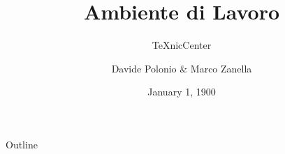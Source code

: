 \documentclass{beamer}
\title{Ambiente di Lavoro}
\subtitle{TeXnicCenter}
\author{Davide Polonio \& Marco Zanella}
\date{January 1, 1900}
\begin{document}
  \graphicspath{{res/images/}}
  \maketitle

  \begin{frame}{Outline}
    \tableofcontents
  \end{frame}


  
\end{document}
